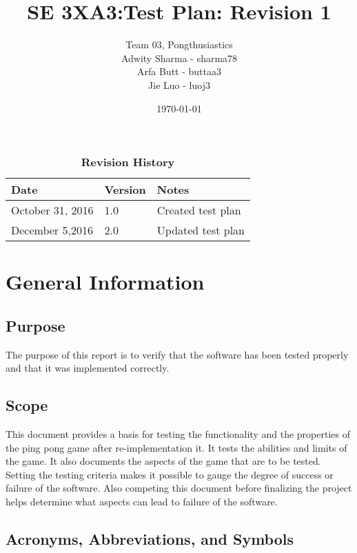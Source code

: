 \documentclass[12pt,letterpaper]{article}
\title{SE 3XA3:Test Plan: Revision 1}
\author{Team 03, Pongthusiastics 		
\\ Adwity Sharma - sharma78 		
\\ Arfa Butt - buttaa3 	
	\\ Jie Luo - luoj3 }
\date{\today}
\begin{document}
\maketitle
\newpage
\tableofcontents

\listoftables
\listoffigures
\begin{table}[h]
\caption{\bf Revision History}
\begin{tabularx}{\textwidth}{p{3.5cm}p{2cm}X}
\toprule {\bf Date} & {\bf Version} & {\bf Notes}\\
\midrule
October 31, 2016 & 1.0 & Created test plan \\
December 5,2016 & 2.0 & Updated test plan \\
\bottomrule
\end{tabularx}
\end{table}

\newpage
	
	\section{General Information}
	\subsection{Purpose}
	The purpose of this report is to verify that the software has been tested properly and that it was implemented correctly.
	
	\subsection{Scope}
	This document provides a basis for testing the functionality and the properties of the ping pong game after re-implementation it. It tests the abilities and limits of the game. It also documents the aspects of the game that are to be tested. Setting the testing criteria makes it possible to gauge the degree of success or failure of the software. Also competing this document before finalizing the project helps determine what aspects can lead to failure of the software.
	
	\subsection{Acronyms, Abbreviations, and Symbols}
\end{document}
